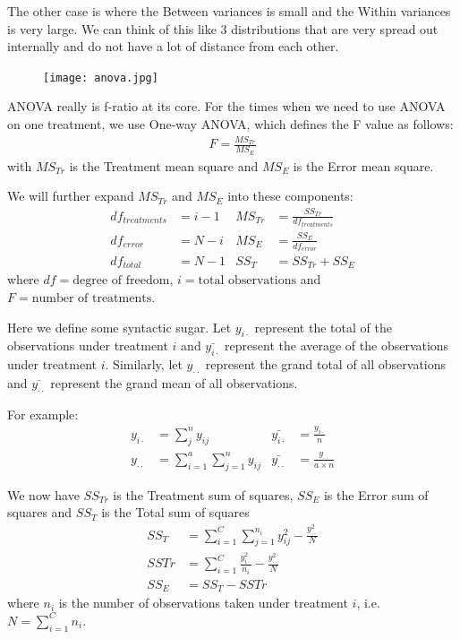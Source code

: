 \documentclass[a4paper]{article}
\numberwithin{equation}{section}
\begin{document}
The other case is where the Between variances is small and the Within variances is very large.
We can think of this like 3 distributions that are very spread out internally and do not have a lot of distance from each other.
\begin{figure}[H]
  \centering
  \texttt{[image: anova.jpg]}
\end{figure}

ANOVA really is f-ratio at its core.
For the times when we need to use ANOVA on one treatment, we use One-way ANOVA, which defines the F value as follows:
\begin{align*}
  F = \frac{MS_{Tr}}{MS_{E}}
\end{align*}
with \(MS_{Tr}\) is the Treatment mean square and \(MS_{E}\) is the Error mean square.

We will further expand \(MS_{Tr}\) and \(MS_{E}\) into these components:
\begin{align*}
  df_{treatments} & = i - 1 & MS_{Tr} & = \frac{SS_{Tr}}{df_{treatments}} \\
  df_{error}      & = N - i & MS_{E}  & = \frac{SS_{E}}{df_{error}}       \\
  df_{total}      & = N - 1 & SS_{T}  & = SS_{Tr} + SS_{E}
\end{align*}
where \(df = \text{degree of freedom}\), \(i = \text{total observations}\) and \(F = \text{number of treatments}\).

Here we define some syntactic sugar. Let \(y_{i\cdot}\) represent the total of the observations under treatment \(i\) and \(\bar{y_{i\cdot}}\) represent the average of the observations under treatment \(i\).
Similarly, let \(y_{\cdot\cdot}\) represent the grand total of all observations and \(\bar{y_{\cdot\cdot}}\) represent the grand mean of all observations.

For example:
\begin{align*}
  y_{i\cdot}     & = \sum_{j}^{n} y_{ij}                  & \bar{y_{i\cdot}}     & = \frac{y_{i\cdot}}{n}              \\
  y_{\cdot\cdot} & = \sum_{i=1}^{a} \sum_{j=1}^{n} y_{ij} & \bar{y_{\cdot\cdot}} & = \frac{y_{\cdot\cdot}}{a \times n}
\end{align*}

We now have \(SS_{Tr}\) is the Treatment sum of squares, \(SS_{E}\) is the Error sum of squares and \(SS_{T}\) is the Total sum of squares
\begin{align*}
  SS_{T} & = \sum_{i=1}^{C} \sum_{j=1}^{n_i} y_{ij}^2 - \frac{y_{\cdot\cdot}^2}{N}  \\
  SS{Tr} & = \sum_{i=1}^{C} \frac{y_{i\cdot}^{2}}{n_i} - \frac{y_{\cdot\cdot}^2}{N} \\
  SS_{E} & = SS_{T} - SS{Tr}
\end{align*}
where \(n_i\) is the number of observations taken under treatment \(i\), i.e. \(N = \sum_{i=1}^{C} n_i\).
\end{document}
